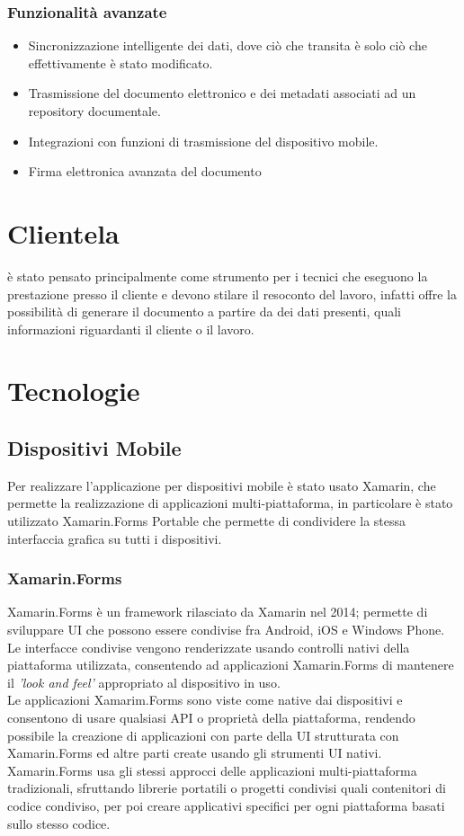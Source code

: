 \subsubsection{Funzionalità avanzate}
\begin{itemize}
	\item Sincronizzazione intelligente dei dati, dove ciò che transita è solo ciò che effettivamente è stato modificato.
	\item Trasmissione del documento elettronico e dei metadati associati ad un repository documentale.
	\item Integrazioni con funzioni di trasmissione del dispositivo mobile.
	\item Firma elettronica avanzata del documento
\end{itemize}

\section{Clientela}
\app è stato pensato principalmente come strumento per i tecnici che eseguono la prestazione presso il cliente e devono stilare il resoconto del lavoro, infatti offre la possibilità di generare il documento a partire da dei dati presenti, quali informazioni riguardanti il cliente o il lavoro.

\section{Tecnologie}
\subsection{Dispositivi Mobile}
Per realizzare l'applicazione per dispositivi mobile è stato usato Xamarin, che permette la realizzazione di applicazioni multi-piattaforma, in particolare è stato utilizzato Xamarin.Forms Portable che permette di condividere la stessa interfaccia grafica su tutti i dispositivi.
\subsubsection{Xamarin.Forms}
Xamarin.Forms è un framework rilasciato da Xamarin nel 2014; permette di sviluppare UI che possono essere condivise fra Android, iOS e Windows Phone. Le interfacce condivise vengono renderizzate usando controlli nativi della piattaforma utilizzata, consentendo ad applicazioni Xamarin.Forms di mantenere il \textit{'look and feel'} appropriato al dispositivo in uso.
\\
Le applicazioni Xamarim.Forms sono viste come native dai dispositivi e consentono di usare qualsiasi API o proprietà della piattaforma, rendendo possibile la creazione di applicazioni con parte della UI strutturata con Xamarin.Forms ed altre parti create usando gli strumenti UI nativi.
\\
Xamarin.Forms usa gli stessi approcci delle applicazioni multi-piattaforma tradizionali, sfruttando librerie portatili o progetti condivisi quali contenitori di codice condiviso, per poi creare applicativi specifici per ogni piattaforma basati sullo stesso codice.
